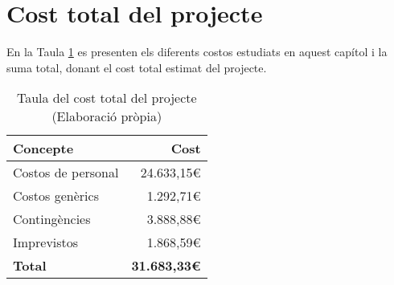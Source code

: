 \section{Cost total del projecte}
En la Taula \ref{tab:cost_total} es presenten els diferents costos estudiats en aquest capítol i la suma total, donant el cost total estimat del projecte.

\begin{table}[H]
    \centering
    \begin{tabular}{l|r}
         \textbf{Concepte} & \textbf{Cost} \\
    \hline
         Costos de personal  &  24.633,15\euro \\
         Costos genèrics     &  1.292,71\euro \\
         Contingències       &  3.888,88\euro \\
         Imprevistos         &  1.868,59\euro \\
     \hline
         \textbf{Total} & \textbf{31.683,33\euro} \\
    \end{tabular}
    \caption[Cost total del projecte]{Taula del cost total del projecte \\ (Elaboració pròpia)}
    \label{tab:cost_total}
\end{table}
